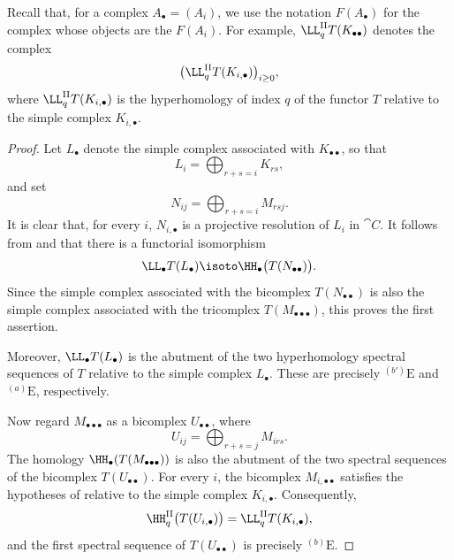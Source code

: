 Recall that, for a complex $A_\bullet=(A_i)$, we use the notation
$F(A_\bullet)$ for the complex whose objects are the $F(A_i)$.
For example, $\LL^{\mathrm{II}}_qT(K_{\bullet\bullet})$ denotes the complex
\[
  \bigl(\LL^{\mathrm{II}}_qT(K_{i,\bullet})\bigr)_{i\geq 0},
\]
where $\LL^{\mathrm{II}}_qT(K_{i,\bullet})$ is the hyperhomology of index
$q$ of the functor $T$ relative to the simple complex $K_{i,\bullet}$.

\begin{proof}
Let $L_\bullet$ denote the simple complex associated with
$K_{\bullet\bullet}$, so that
\[
  L_i=\bigoplus_{r+s=i}K_{rs},
\]
and set
\[
  N_{ij}=\bigoplus_{r+s=i}M_{rsj}.
\]
It is clear that, for every $i$, $N_{i,\bullet}$ is a projective resolution
of $L_i$ in $\cat{C}$.
It follows from  and  that there is a
functorial isomorphism
\[
  \LL_\bullet T(L_\bullet)
  \isoto
  \HH_\bullet\bigl(T(N_{\bullet\bullet})\bigr).
\]
Since the simple complex associated with the bicomplex
$T(N_{\bullet\bullet})$ is also the simple complex associated with the
tricomplex $T(M_{\bullet\bullet\bullet})$, this proves the first assertion.

Moreover, $\LL_\bullet T(L_\bullet)$ is the abutment of the two
hyperhomology spectral sequences  of $T$ relative to the
simple complex $L_\bullet$.
These are precisely ${}^{(b')}\mathrm{E}$ and ${}^{(a)}\mathrm{E}$,
respectively.

Now regard $M_{\bullet\bullet\bullet}$ as a bicomplex
$U_{\bullet\bullet}$, where
\[
  U_{ij}=\bigoplus_{r+s=j}M_{irs}.
\]
The homology $\HH_\bullet(T(M_{\bullet\bullet\bullet}))$ is also the
abutment of the two spectral sequences of the bicomplex
$T(U_{\bullet\bullet})$.
For every $i$, the bicomplex $M_{i,\bullet\bullet}$ satisfies the
hypotheses of  relative to the simple complex
$K_{i,\bullet}$.
Consequently,
\[
  \HH^{\mathrm{II}}_q\bigl(T(U_{i,\bullet})\bigr)
  =
  \LL^{\mathrm{II}}_qT(K_{i,\bullet}),
\]
and the first spectral sequence of $T(U_{\bullet\bullet})$ is precisely
${}^{(b)}\mathrm{E}$.


\end{proof}
